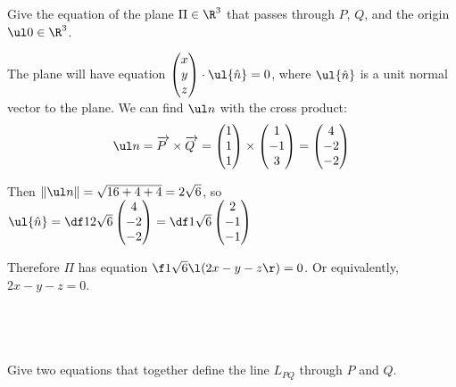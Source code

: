 \documentclass[a4paper]{article}
\begin{document}
\subsection{~} %

\begin{questionbody}
Give the equation of the plane $\Pi \in \R^3$ that passes through $P$, $Q$, and the origin $\ul 0 \in \R^3$.
\end{questionbody}

The plane will have equation $\begin{pmatrix}x\\ y\\ z\end{pmatrix} \cdot \ul{\hat n} = 0$, where $\ul{\hat n}$ is a unit normal vector to the plane. We can find $\ul n$ with the cross product: \[
\ul n = \overrightarrow{P\;} \times \overrightarrow{Q\;}
= \begin{pmatrix}1\\ 1\\ 1\end{pmatrix}
\times \begin{pmatrix}1\\ -1\\ 3\end{pmatrix}
= \begin{pmatrix}4\\ -2\\ -2\end{pmatrix}
\]

Then $\|\ul n\| = \sqrt{16+4+4} = 2\sqrt6$, so $\ul{\hat n} = \df1{2\sqrt6} \begin{pmatrix}4\\ -2\\ -2\end{pmatrix} = \df1{\sqrt6} \begin{pmatrix}2\\ -1\\ -1\end{pmatrix}$

Therefore $\Pi$ has equation $\f1{\sqrt6} \l( 2x - y - z \r) = 0$. Or equivalently, $2x - y - z = 0$.

\subsection{~} %

\begin{questionbody}
Give two equations that together define the line $L_{PQ}$ through $P$ and $Q$.
\end{questionbody}
\end{document}
